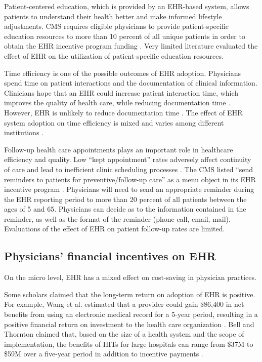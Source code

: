 \documentclass[12pt]{report}
\begin{document}
Patient-centered education, which is provided by an EHR-based system, allows patients to understand their health better and make informed lifestyle adjustments. CMS requires eligible physicians to provide patient-specific education resources to more than 10 percent of all unique patients in order to obtain the EHR incentive program funding \citep{healthit05}. Very limited literature evaluated the effect of EHR on the utilization of patient-specific education resources. 

Time efficiency is one of the possible outcomes of EHR adoption. Physicians spend time on patient interactions and the documentation of clinical information. Clinicians hope that an EHR could increase patient interaction time, which improves the quality of health care, while reducing documentation time \citep{leung2003incentives}. However, EHR is unlikely to reduce documentation time \citep{poissant2005impact}. The effect of EHR system adoption on time efficiency is mixed and varies among different institutions \citep{makoul2001use, Chaudhry2006}. 

Follow-up health care appointments plays an important role in healthcare efficiency and quality. Low ``kept appointment'' rates adversely affect continuity of care and lead to inefficient clinic scheduling processes \citep{myers2001strategies}. The CMS listed ``send reminders to patients for preventive/follow-up care'' as a menu object in its EHR incentive program \citep{cmsincentive14}. Physicians will need to send an appropriate reminder during the EHR reporting period to more than 20 percent of all patients between the ages of 5 and 65. Physicians can decide as to the information contained in the reminder, as well as the format of the reminder (phone call, email, mail). Evaluations of the effect of EHR on patient follow-up rates are limited.

\subsection{Physicians' financial incentives on EHR}
On the micro level, EHR has a mixed effect on cost-saving in physician practices.

Some scholars claimed that the long-term return on adoption of EHR is positive. For example, Wang et al. estimated that a provider could gain \$86,400 in net benefits from using an electronic medical record for a 5-year period, resulting in a positive financial return on investment to the health care organization \citep{Wang2003}. Bell and Thornton claimed that, based on the size of a health system and the scope of implementation, the benefits of HITs for large hospitals can range from \$37M to \$59M over a five-year period in addition to incentive payments \citep{Bell2011}.
\end{document}
